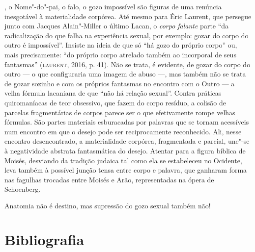 , o Nome"-do"-pai, o falo, o gozo impossível são figuras de uma
renúncia inesgotável à materialidade corpórea. Até mesmo para Éric
Laurent, que persegue junto com Jacques Alain"-Miller o último
Lacan, o \emph{corpo falante} parte ``da radicalização do que falha na
experiência sexual, por exemplo: gozar do corpo do outro é impossível''.
Insiste na ideia de que só ``há gozo do próprio corpo'' ou, mais
precisamente: ``do próprio corpo atrelado também ao incorporal de seus
fantasmas'' (\textsc{laurent}, 2016, p. 41). Não se trata, é evidente, de gozar
do corpo do outro --- o que configuraria uma imagem de abuso ---, mas
também não se trata de gozar sozinho e com os próprios fantasmas no
encontro com o Outro --- a velha fórmula lacaniana de que ``não há
relação sexual''. Contra práticas quiromaníacas de teor obsessivo, que
fazem do corpo resíduo, a colisão de parcelas fragmentárias de corpos
parece ser o que efetivamente rompe velhas fórmulas. São partes
materiais esburacadas por palavras que se tornam acessíveis num encontro
em que o desejo pode ser reciprocamente reconhecido. Ali, nesse encontro
desencontrado, a materialidade corpórea, fragmentada e parcial, une"-se à
negatividade abstrata fantasmática do desejo. Atentar para a figura
bíblica de Moisés, desviando da tradição judaica tal como ela se
estabeleceu no Ocidente, leva também à possível junção tensa entre corpo
e palavra, que ganharam forma nas fagulhas trocadas entre Moisés e Arão,
representadas na ópera de Schoenberg.

Anatomia não é destino, mas supressão do gozo sexual também não!

\pagebreak

\section{Bibliografia}

